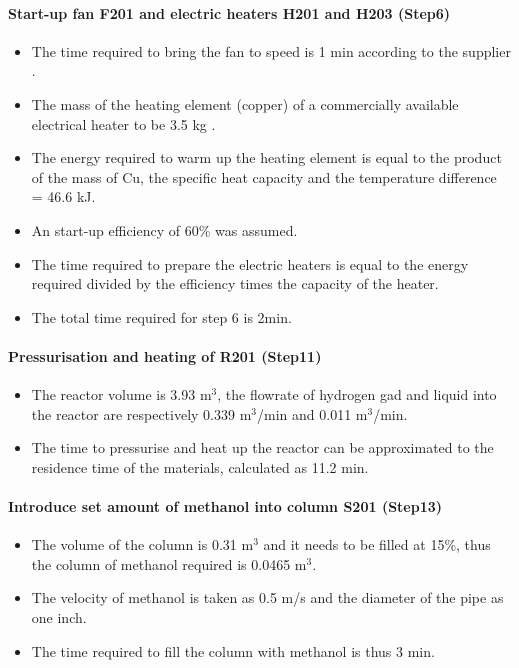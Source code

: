 \paragraph{Start-up fan F201 and electric heaters H201 and H203 (Step6)}
\begin{itemize}
        \item The time required to bring the fan to speed is 1 min according to the supplier \cite{twin_city_fan_companies_ltd_application_2000}.
        \item The mass of the heating element (copper) of a commercially available electrical heater to be 3.5 kg \cite{wattco_flanged_nodate}.
        \item The energy required to warm up the heating element is equal to the product of the mass of Cu, the specific heat capacity and the temperature difference = 46.6 kJ.
        \item An start-up efficiency of 60\% was assumed.
        \item The time required to prepare the electric heaters is equal to the energy required divided by the efficiency times the capacity of the heater. 
        \item The total time required for step 6 is 2min.
    \end{itemize}
    
\paragraph{Pressurisation and heating of R201 (Step11)}
\begin{itemize}
    \item The reactor volume is 3.93 m$^3$, the flowrate of hydrogen gad and liquid into the reactor are respectively 0.339 m$^3$/min and 0.011  m$^3$/min.
    \item The time to pressurise and heat up the reactor can be approximated to the residence time of the materials, calculated as 11.2 min.
\end{itemize}

\paragraph{Introduce set amount of methanol into column S201 (Step13)}
\begin{itemize}
    \item The volume of the column is 0.31 m$^3$ and it needs to be filled at 15\%, thus the column of methanol required is 0.0465 m$^3$.
    \item The velocity of methanol is taken as 0.5 m/s and the diameter of the pipe as one inch.
    \item The time required to fill the column with methanol is thus 3 min.
\end{itemize}


